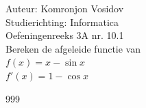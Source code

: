 \documentclass[a4paper]{article}
\begin{document}
	
	\noindent \large Auteur: Komronjon Vosidov \\
	\noindent \large Studierichting: Informatica\\
	\noindent \large Oefeningenreeks 3A nr. 10.1\\
	
	
	
	\normalsize
	Bereken de afgeleide functie van\\
	
	$f(x) = x - \sin x$\\
	
	$f'(x) = 1 - \cos x$\\
	
	
	
	
	\begin{thebibliography}{999}
	\end{thebibliography}	
	
\end{document}
